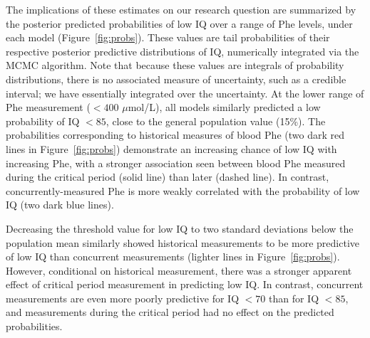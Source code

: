 \documentclass{svjour3}                     %
\begin{document}
The implications of these estimates on our research question are summarized by the posterior predicted probabilities of low IQ over a range of Phe levels, under each model (Figure~\ref{fig:probs}). These values are tail probabilities of their respective posterior predictive distributions of IQ, numerically integrated via the MCMC algorithm. Note that because these values are integrals of probability distributions, there is no associated measure of uncertainty, such as a credible interval; we have essentially integrated over the uncertainty. At the lower range of Phe measurement ($<400$ $\mu$mol/L), all models similarly predicted a low probability of IQ $<85$, close to the general population value (15\%). The probabilities corresponding to historical measures of blood Phe (two dark red lines in Figure~\ref{fig:probs}) demonstrate an increasing chance of low IQ with increasing Phe, with a stronger association seen between blood Phe measured during the critical period (solid line) than later (dashed line). In contrast, concurrently-measured Phe is more weakly correlated with the probability of low IQ (two dark blue lines).

Decreasing the threshold value for low IQ to two standard deviations below the population mean similarly showed historical measurements to be more predictive of low IQ than concurrent measurements (lighter lines in Figure~\ref{fig:probs}). However, conditional on historical measurement, there was a stronger apparent effect of critical period measurement in predicting low IQ. In contrast, concurrent measurements are even more poorly predictive for IQ $<70$ than for IQ $<85$, and measurements during the critical period had no effect on the predicted probabilities.
\end{document}
